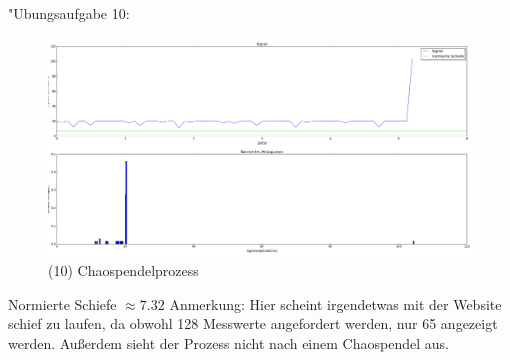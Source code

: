

	"Ubungsaufgabe 10: \newline
	\begin{figure}
		\includegraphics[width=1.0\textwidth]{A10.png}
		\caption{(10) Chaospendelprozess}
	\end{figure}
	Normierte Schiefe $\approx 7.32$ \newline
	Anmerkung: Hier scheint irgendetwas mit der Website schief zu laufen, da obwohl 128 Messwerte angefordert werden, nur 65 angezeigt werden.
	Außerdem sieht der Prozess nicht nach einem Chaospendel aus.
